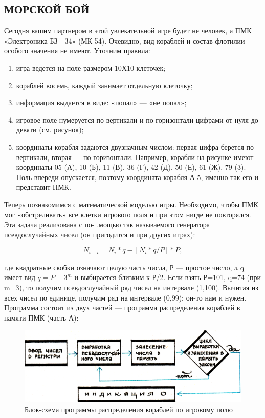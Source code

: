 \documentclass[11pt,a4paper,oneside]{article}
\begin{document}
\subsection{МОРСКОЙ БОЙ}
Сегодня вашим партнером в этой увлекательной игре будет не человек, а ПМК «Электроника БЗ—34» (МК-54). Очевидно, вид кораблей и состав флотилии особого значения не имеют. Уточним правила:
\begin{enumerate}
\item игра ведется на поле размером 10Х10 клеточек;
\item кораблей восемь, каждый занимает отдельную клеточку;
\item информация выдается в виде: «попал» — «не попал»;
\item игровое поле нумеруется по вертикали и по горизонтали цифрами от нуля до девяти (см. рисунок);
\item координаты корабля задаются двузначным числом: первая цифра берется по вертикали, вторая — по горизонтали. Например, корабли на рисунке имеют координаты 05 (А), 10 (Б), 11 (В), 36 (Г), 42 (Д), 50 (Е), 61 (Ж), 79 (3). Ноль впереди опускается, поэтому координата корабля А-5, именно так его и представит ПМК.
\end{enumerate}

Теперь познакомимся с математической моделью игры. Необходимо, чтобы ПМК мог «обстреливать» все клетки игрового поля и при этом нигде не повторялся. Эта задача реализована с по- .мощью так называемого генератора псевдослучайных чисел (он пригодится и при других играх):

\begin{equation}
N_{i+i} =N_{i}*q-[N_{i}*q/P]*P,
\end{equation}

где квадратные скобки означают целую часть числа, Р — простое число, a q имеет вид $q=P-3^{m}$ и выбирается близким к Р/2. Если взять Р=101, q=74 (при m=3), то получим псевдослучайный ряд чисел на интервале (1,100). Вычитая из всех чисел по единице, получим ряд на интервале (0,99); он-то нам и нужен. Программа состоит из двух частей — программа распределения кораблей в памяти ПМК (часть А):

\begin{figure}[H]
\includegraphics[width=\textwidth]{sea1}
\caption{Блок-схема программы распределения кораблей по игровому полю}
\end{figure}
\end{document}
